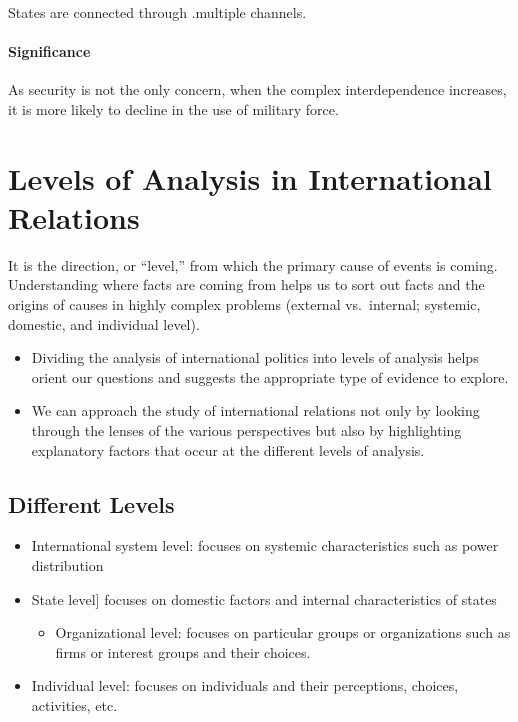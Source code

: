 \documentclass[
]{book}
\providecommand{\tightlist}{%
  \setlength{\itemsep}{0pt}\setlength{\parskip}{0pt}}
\begin{document}
States are connected through .multiple channels.

\hypertarget{significance-8}{%
\subsubsection{Significance}\label{significance-8}}

As security is not the only concern, when the complex interdependence increases, it is more likely to decline in the use of military force.

\hypertarget{levels-of-analysis-in-international-relations}{%
\chapter{Levels of Analysis in International Relations}\label{levels-of-analysis-in-international-relations}}

It is the direction, or ``level,'' from which the primary cause of events is coming. Understanding where facts are coming from helps us to sort out facts and the origins of causes in highly complex problems (external vs.~internal; systemic, domestic, and individual level).

\begin{itemize}
\item
  Dividing the analysis of international politics into levels of analysis helps orient our questions and suggests the appropriate type of evidence to explore.
\item
  We can approach the study of international relations not only by looking through the lenses of the various perspectives but also by highlighting explanatory factors that occur at the different levels of analysis.
\end{itemize}

\hypertarget{different-levels}{%
\section{Different Levels}\label{different-levels}}

\begin{itemize}
\item
  International system level: focuses on systemic characteristics such as power distribution
\item
  State level{]} focuses on domestic factors and internal characteristics of states

  \begin{itemize}
  \tightlist
  \item
    Organizational level: focuses on particular groups or organizations such as firms or interest groups and their choices.
  \end{itemize}
\item
  Individual level: focuses on individuals and their perceptions, choices, activities, etc.
\end{itemize}
\end{document}
